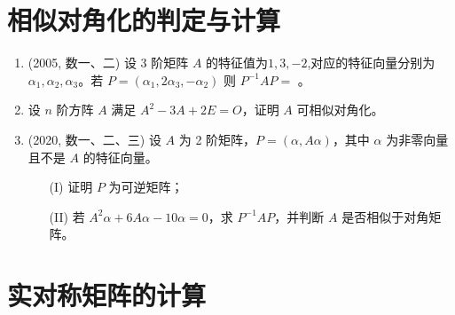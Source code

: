 \documentclass[12pt, a4paper, oneside, UTF8]{ctexbook}
\begin{document}
\section{相似对角化的判定与计算}

\begin{enumerate}
    \item (2005, 数一、二) 设 3 阶矩阵 $A$ 的特征值为$1, 3, -2$,对应的特征向量分别为 $\alpha_1, \alpha_2, \alpha_3$。若
    $P = (\alpha_1, 2\alpha_3, -\alpha_2)$
    则 $P^{-1}AP = $ \underline{\hspace{3cm}}。
    
    \begin{solution}
    \newpage
    \end{solution}
    
    \item 设 $n$ 阶方阵 $A$ 满足 $A^2 - 3A + 2E = O$，证明 $A$ 可相似对角化。
    
    \begin{solution}
    \newpage
    \end{solution}
    
    \item (2020, 数一、二、三) 设 $A$ 为 2 阶矩阵，$P = (\alpha, A\alpha)$，其中 $\alpha$ 为非零向量且不是 $A$ 的特征向量。
    \begin{enumerate}
        \item [(I)] 证明 $P$ 为可逆矩阵；
        \item [(II)] 若 $A^2\alpha + 6A\alpha - 10\alpha = 0$，求 $P^{-1}AP$，并判断 $A$ 是否相似于对角矩阵。
    \end{enumerate}
    
    \begin{solution}
    \newpage
    \end{solution}
\end{enumerate}

\section{实对称矩阵的计算}
\end{document}
